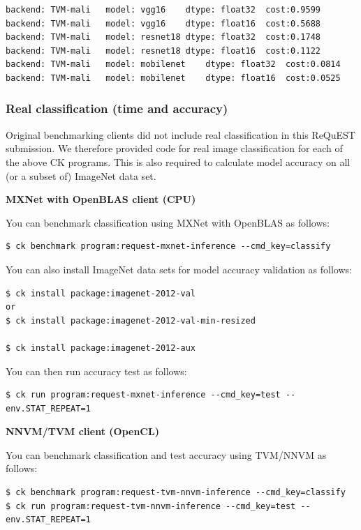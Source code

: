 \documentclass[sigplan]{acmart}
\begin{document}
\begin{verbatim}
backend: TVM-mali	model: vgg16	dtype: float32	cost:0.9599
backend: TVM-mali	model: vgg16	dtype: float16	cost:0.5688
backend: TVM-mali	model: resnet18	dtype: float32	cost:0.1748
backend: TVM-mali	model: resnet18	dtype: float16	cost:0.1122
backend: TVM-mali	model: mobilenet	dtype: float32	cost:0.0814
backend: TVM-mali	model: mobilenet	dtype: float16	cost:0.0525
\end{verbatim}

\subsubsection{Real classification (time and accuracy)}

Original benchmarking clients did not include real classification in this ReQuEST submission. 
We therefore provided code for real image classification for each of the above CK programs.
This is also required to calculate model accuracy on all (or a subset of) ImageNet data set.

\textbf{MXNet with OpenBLAS client (CPU)}

You can benchmark classification using MXNet with OpenBLAS as follows:

\begin{verbatim} 
$ ck benchmark program:request-mxnet-inference --cmd_key=classify
\end{verbatim}

You can also install ImageNet data sets for model accuracy validation as follows:

\begin{verbatim}
$ ck install package:imagenet-2012-val
or
$ ck install package:imagenet-2012-val-min-resized

$ ck install package:imagenet-2012-aux
\end{verbatim}

You can then run accuracy test as follows:

\begin{verbatim} 
$ ck run program:request-mxnet-inference --cmd_key=test --env.STAT_REPEAT=1
\end{verbatim}

\textbf{NNVM/TVM client (OpenCL)}

You can benchmark classification and test accuracy using TVM/NNVM as follows:

\begin{verbatim}
$ ck benchmark program:request-tvm-nnvm-inference --cmd_key=classify
$ ck run program:request-tvm-nnvm-inference --cmd_key=test --env.STAT_REPEAT=1
\end{verbatim}
\end{document}
